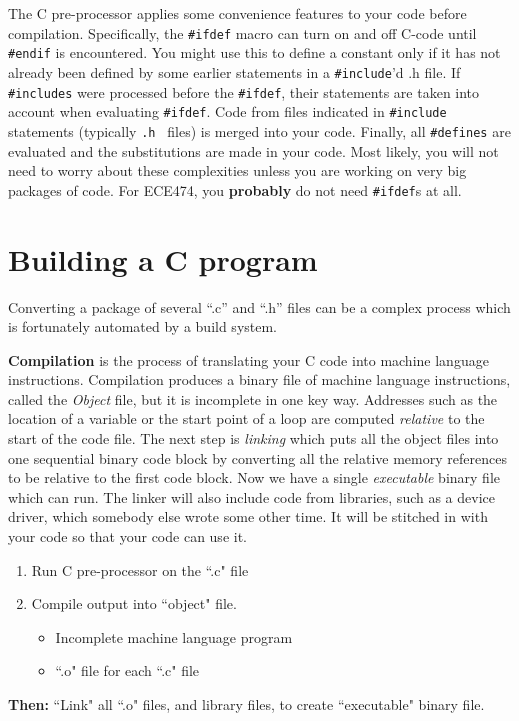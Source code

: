 The C pre-processor applies some convenience features to your code before 
compilation.  Specifically, the {\tt \#ifdef} macro can turn on and off C-code
until {\tt \#endif} is encountered.   You might use this to define a constant only
if it has not already been defined by some earlier statements in a {\tt \#include}'d .h file.  If {\tt \#includes} were processed before the {\tt \#ifdef}, their statements
are taken into account when evaluating {\tt \#ifdef}.
Code from files indicated in {\tt \#include} statements (typically {\tt .h } files) is merged into your code.  Finally, all {\tt \#defines} are evaluated and the 
substitutions are made in your code.   Most likely, you will not need to worry about
these complexities unless you are working on very big packages of code.   For 
ECE474, you {\bf  probably} do not need {\tt \#ifdef}s at all. 

\section{Building a C program}

Converting a package of several ``.c'' and ``.h'' files can be a complex
process which is fortunately automated by a build system.

{\bf Compilation} is the process of translating your C code into machine language
instructions.   Compilation produces a binary file of machine language instructions, called the {\it Object} file, but it is incomplete in one key way.
Addresses such as the location of a variable or the
start point of a loop are computed {\it relative} to the start of the
code file.  The next step is {\it linking} which puts all the object
files into one sequential binary code block by converting all
the relative memory references to be relative to the first code block.
Now we have a single {\it executable} binary file which can run. The linker
will also include code from libraries, such as a device driver, which
somebody else wrote some other time.  It will be stitched in with your
code so that your code can use it.


\begin{enumerate}
	\item Run C pre-processor on the ``.c" file
	\item Compile output into ``object" file.
	\begin{itemize}
		\item Incomplete machine language program
		\item ``.o" file for each ``.c" file
	\end{itemize}
\end{enumerate}

{\bf Then: } ``Link" all ``.o" files, and library files,
	to create ``executable" binary file. 
%



